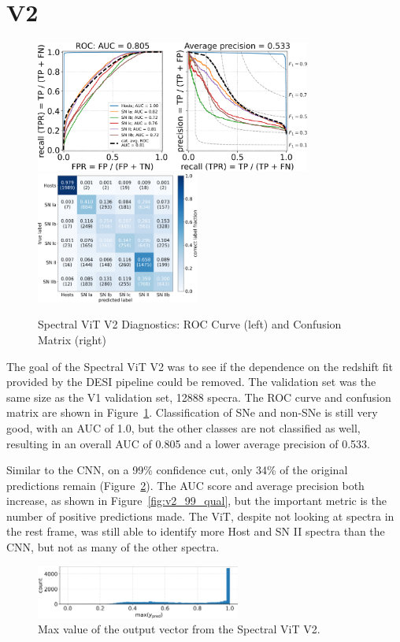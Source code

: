 \section{V2}
\begin{figure}[b]
    \centering
    \includegraphics[height=4.3cm]{figures/v2_real/vit_model_V2rocfulle_e26.png}
    \quad
    \includegraphics[height=4.3cm]{figures/v2_real/vit_model_V2cmfull_e26.png}
    \caption{Spectral ViT V2 Diagnostics: ROC Curve (left) and Confusion Matrix (right)\label{fig:v2_qual}}
\end{figure}
The goal of the Spectral ViT V2 was to see if the dependence on the redshift fit 
provided by the DESI pipeline could be removed. The validation set was the same size 
as the V1 validation set, 12888 specra. The ROC curve and confusion matrix are shown
in Figure~\ref{fig:v2_qual}. Classification of SNe and non-SNe is still very good,
with an AUC of 1.0, but the other classes are not classified as well, resulting in 
an overall AUC of 0.805 and a lower average precision of 0.533. 


Similar to the CNN, on a 99\% confidence cut, only 34\% of the original predictions
remain (Figure~\ref{fig:v2_max}). The AUC score and average precision both increase, as shown in Figure~\ref{fig:v2_99_qual}, 
but the important metric is the number of positive predictions made. The ViT, 
despite not looking at spectra in the rest frame, was still able to identify more 
Host and SN II spectra than the CNN, but not as many of the other spectra. 


\begin{figure}[t]
    \centering
    \includegraphics[width=0.6\textwidth]{figures/v2_real/vit_model_V2max_ypred_26.png}
    \caption{Max value of the output vector from the Spectral ViT V2.\label{fig:v2_max}}
\end{figure}

